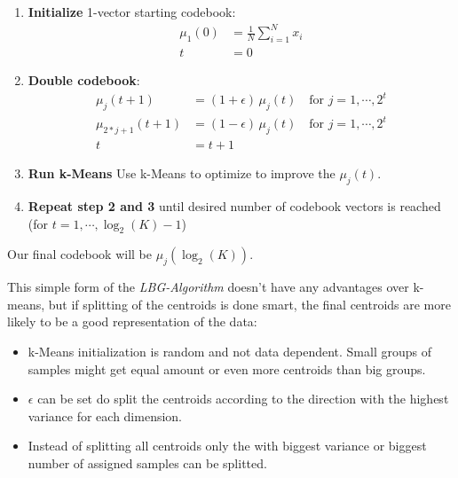 \begin{enumerate}
\item \textbf{Initialize} 1-vector starting codebook:
	\begin{align}
	\mu_1(0) &= \frac{1}{N} \sum\limits_{i=1}^N x_i\\
	t &= 0
	\end{align}
\item \textbf{Double codebook}:
	\begin{align}
	\mu_j(t+1) &= (1+\epsilon)\, \mu_j(t) \quad \text{for } j=1,\cdots,2^t\\
	\mu_{2*j+1}(t+1) &= (1-\epsilon)\, \mu_j(t) \quad \text{for } j=1,\cdots,2^t\\
	t &= t+1
	\end{align}
\item \textbf{Run k-Means} Use k-Means to optimize to improve the $\mu_j(t)$.
\item \textbf{Repeat step 2 and 3} until desired number of codebook vectors is reached (for $t=1,\cdots,\log_2(K)-1$)
\end{enumerate}

Our final codebook will be $\mu_j(\log_2(K))$.

This simple form of the \emph{LBG-Algorithm} doesn't have any advantages over k-means, but if splitting of the centroids is done smart, the final centroids are more likely to be a good representation of the data:
\begin{itemize}
\item k-Means initialization is random and not data dependent. Small groups of samples might get equal amount or even more centroids than big groups.
\item $\epsilon$ can be set do split the centroids according to the direction with the highest variance for each dimension.
\item Instead of splitting all centroids only the  with biggest variance or biggest number of assigned samples can be splitted.
\end{itemize}
